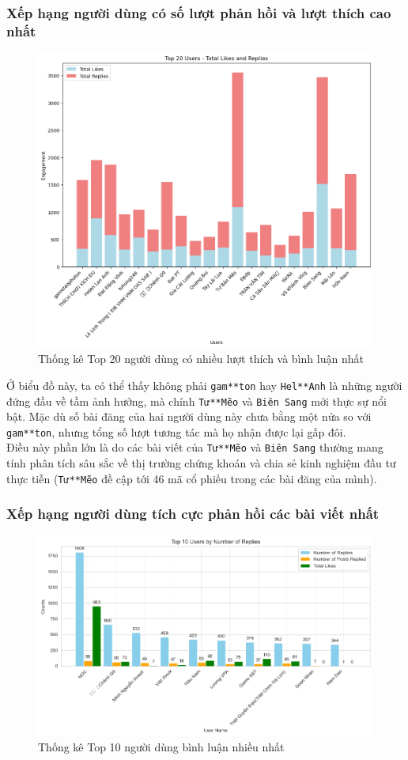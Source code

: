 \subsubsection{Xếp hạng người dùng có số lượt phản hồi và lượt thích cao nhất}
\begin{figure}[H]
    \centering
    \includegraphics[width = 0.75\linewidth]{images/C2_pic28.png}
    \vspace{-1em}
    \caption{Thống kê Top 20 người dùng có nhiều lượt thích và bình luận nhất}
    \label{fig:2.19}
\end{figure}

Ở biểu đồ này, ta có thể thấy không phải \texttt{gam**ton} hay \texttt{Hel**Anh} là những người đứng đầu về tầm ảnh hưởng, mà chính \texttt{Tư**Mẽo} và \texttt{Biên Sang} mới thực sự nổi bật. Mặc dù số bài đăng của hai người dùng này chưa bằng một nửa so với \texttt{gam**ton}, nhưng tổng số lượt tương tác mà họ nhận được lại gấp đôi.\\

Điều này phần lớn là do các bài viết của \texttt{Tư**Mẽo} và \texttt{Biên Sang} thường mang tính phân tích sâu sắc về thị trường chứng khoán và chia sẻ kinh nghiệm đầu tư thực tiễn (\texttt{Tư**Mẽo} đề cập tới 46 mã cổ phiếu trong các bài đăng của mình).

\subsubsection{Xếp hạng người dùng tích cực phản hồi các bài viết nhất}
\begin{figure}[H]
    \centering
    \includegraphics[width = 0.75\linewidth]{images/C2_pic47.png}
    \vspace{-1em}
    \caption{Thống kê Top 10 người dùng bình luận nhiều nhất}
    \label{fig:2.20}
\end{figure}

